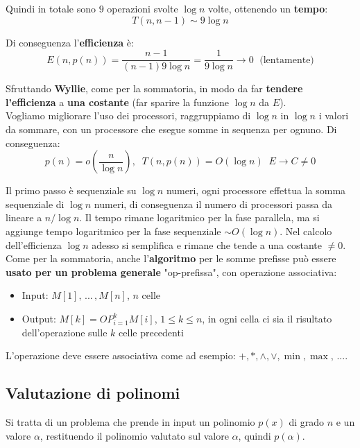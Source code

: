 \documentclass[11pt]{article}
\begin{document}
	Quindi in totale sono $9$ operazioni svolte $\log n$ volte, ottenendo un \textbf{tempo}: 
	$$ T(n,n-1) \sim 9 \log n $$
	
	Di conseguenza l'\textbf{efficienza} è:
	$$ E(n, p(n)) = \frac{n-1}{(n-1) 9 \log n} = \frac{1}{9 \log n} \rightarrow 0 \; \text{ (lentamente)} $$
	
	\newpage
	
	Sfruttando \textbf{Wyllie}, come per la sommatoria, in modo da far \textbf{tendere l'efficienza} a \textbf{una costante} (far sparire la funzione $\log n$ da $E$).\\
	
	Vogliamo migliorare l'uso dei processori, raggruppiamo di $\log n$ in $\log n$ i valori da sommare, con un processore che esegue somme in sequenza per ognuno. Di conseguenza: 
	$$ p(n) = o \left(\frac{n}{\log n}\right), \;\; T(n, p(n)) = O (\log n) \;\; E \rightarrow C \neq 0 $$
	
	Il primo passo è sequenziale su $\log n$ numeri, ogni processore effettua la somma sequenziale di $\log n$ numeri, di conseguenza il numero di processori passa da lineare a $n/\log n$. Il tempo rimane logaritmico per la fase parallela, ma si aggiunge tempo logaritmico per la fase sequenziale $\sim O (\log n)$. Nel calcolo dell'efficienza $\log n$ adesso si semplifica e rimane che tende a una costante $\neq 0$.\\
	
	Come per la sommatoria, anche l'\textbf{algoritmo} per le somme prefisse può essere \textbf{usato per un problema generale} "op-prefissa", con operazione associativa:
	\begin{itemize}
		\item Input: $M[1], \, ... \, , M[n]$, $n$ celle
		\item Output: $M[k] = OP_{i = 1}^k M[i]$, $1 \leq k \leq n$, in ogni cella ci sia il risultato dell'operazione sulle $k$ celle precedenti 
	\end{itemize}
	
	L'operazione deve essere associativa come ad esempio: $+, *, \wedge, \vee, \min, \max, \, ...$.\\
	
	\newpage
	
	\subsection{Valutazione di polinomi}
	Si tratta di un problema che prende in input un polinomio $p(x)$ di grado $n$ e un valore $\alpha$, restituendo il polinomio valutato sul valore $\alpha$, quindi $p(\alpha)$.\\
	
\end{document}
